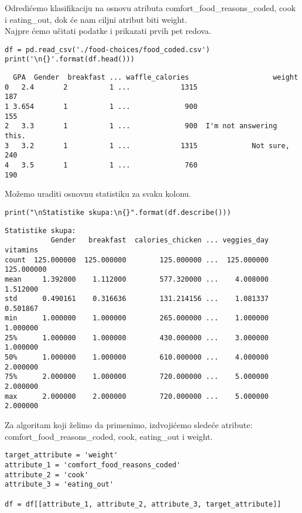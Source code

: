 \documentclass[12pt,a4paper]{article}
\begin{document}
Odredi\' cemo klasifikaciju na osnovu atributa comfort\_food\_reasons\_coded, cook i eating\_out, dok \' ce nam ciljni atribut biti weight.\\

Najpre \' cemo u\v citati podatke i prikazati prvih pet redova.\\

\begin{lstlisting}[mathescape=true]
df = pd.read_csv('./food-choices/food_coded.csv')
print('\n{}'.format(df.head()))
\end{lstlisting}

\begin{verbatim}
  GPA  Gender  breakfast ... waffle_calories                    weight
0   2.4       2          1 ...            1315                       187
1 3.654       1          1 ...             900                       155
2   3.3       1          1 ...             900  I'm not answering this.
3   3.2       1          1 ...            1315             Not sure, 240
4   3.5       1          1 ...             760                       190
\end{verbatim}

Mo\v zemo uraditi osnovnu statistiku za svaku kolonu.

\begin{lstlisting}[mathescape=true]
print("\nStatistike skupa:\n{}".format(df.describe()))
\end{lstlisting}

\begin{verbatim}
Statistike skupa:
           Gender   breakfast  calories_chicken ... veggies_day    vitamins
count  125.000000  125.000000        125.000000 ...  125.000000  125.000000
mean     1.392000    1.112000        577.320000 ...    4.008000    1.512000
std      0.490161    0.316636        131.214156 ...    1.081337    0.501867
min      1.000000    1.000000        265.000000 ...    1.000000    1.000000
25%      1.000000    1.000000        430.000000 ...    3.000000    1.000000
50%      1.000000    1.000000        610.000000 ...    4.000000    2.000000
75%      2.000000    1.000000        720.000000 ...    5.000000    2.000000
max      2.000000    2.000000        720.000000 ...    5.000000    2.000000
\end{verbatim}

Za algoritam koji \v zelimo da primenimo, izdvoji\' cemo slede\' ce atribute: comfort\_food\_reasons\_coded, cook, eating\_out i weight.

\begin{lstlisting}[mathescape=true]
target_attribute = 'weight'
attribute_1 = 'comfort_food_reasons_coded'
attribute_2 = 'cook'
attribute_3 = 'eating_out'

df = df[[attribute_1, attribute_2, attribute_3, target_attribute]]
\end{lstlisting}
\end{document}
